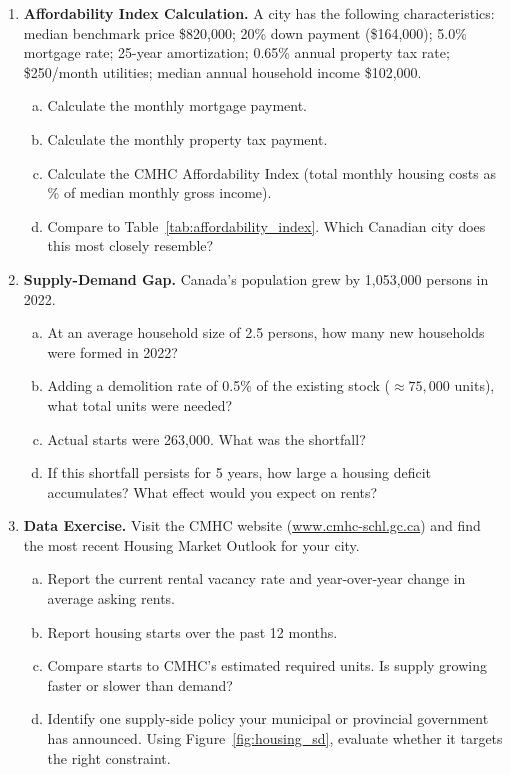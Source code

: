 \begin{enumerate}
\item \textbf{Affordability Index Calculation.}
A city has the following characteristics: median benchmark price
\$820{,}000; 20\% down payment (\$164{,}000); 5.0\% mortgage rate;
25-year amortization; 0.65\% annual property tax rate; \$250/month
utilities; median annual household income \$102{,}000.
\begin{enumerate}[(a)]
  \item Calculate the monthly mortgage payment.
  \item Calculate the monthly property tax payment.
  \item Calculate the CMHC Affordability Index (total monthly housing
        costs as \% of median monthly gross income).
  \item Compare to Table~\ref{tab:affordability_index}. Which Canadian
        city does this most closely resemble?
\end{enumerate}

\item \textbf{Supply-Demand Gap.}
Canada's population grew by 1{,}053{,}000 persons in 2022.
\begin{enumerate}[(a)]
  \item At an average household size of 2.5 persons, how many new
        households were formed in 2022?
  \item Adding a demolition rate of 0.5\% of the existing stock
        ($\approx 75{,}000$ units), what total units were needed?
  \item Actual starts were 263{,}000. What was the shortfall?
  \item If this shortfall persists for 5 years, how large a housing
        deficit accumulates? What effect would you expect on rents?
\end{enumerate}

\item \textbf{Data Exercise.} Visit the CMHC website
(\url{www.cmhc-schl.gc.ca}) and find the most recent Housing Market
Outlook for your city.
\begin{enumerate}[(a)]
  \item Report the current rental vacancy rate and year-over-year
        change in average asking rents.
  \item Report housing starts over the past 12 months.
  \item Compare starts to CMHC's estimated required units. Is supply
        growing faster or slower than demand?
  \item Identify one supply-side policy your municipal or provincial
        government has announced. Using Figure~\ref{fig:housing_sd},
        evaluate whether it targets the right constraint.
\end{enumerate}

\end{enumerate}

